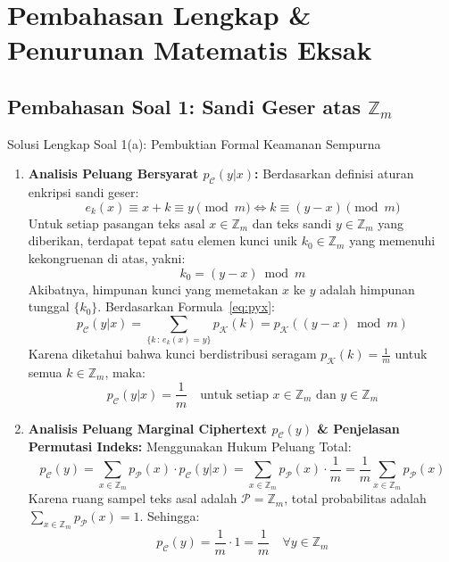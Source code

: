 \documentclass[11pt,a4paper]{article}
\begin{document}
\newpage

\section{Pembahasan Lengkap \& Penurunan Matematis Eksak}

\subsection{Pembahasan Soal 1: Sandi Geser atas $\mathbb{Z}_m$}

\begin{solusibox}{Solusi Lengkap Soal 1(a): Pembuktian Formal Keamanan Sempurna}
\begin{enumerate}[leftmargin=*]
    \item \textbf{Analisis Peluang Bersyarat $p_{\mathcal{C}}(y|x)$:}
    Berdasarkan definisi aturan enkripsi sandi geser:
    \[
    e_k(x) \equiv x + k \equiv y \pmod m \iff k \equiv (y - x) \pmod m
    \]
    Untuk setiap pasangan teks asal $x \in \mathbb{Z}_m$ dan teks sandi $y \in \mathbb{Z}_m$ yang diberikan, terdapat tepat satu elemen kunci unik $k_0 \in \mathbb{Z}_m$ yang memenuhi kekongruenan di atas, yakni:
    \[
    k_0 = (y - x) \bmod m
    \]
    Akibatnya, himpunan kunci yang memetakan $x$ ke $y$ adalah himpunan tunggal $\{k_0\}$. Berdasarkan Formula~\eqref{eq:pyx}:
    \[
    p_{\mathcal{C}}(y|x) = \sum_{\{k \,:\, e_k(x) = y\}} p_{\mathcal{K}}(k) = p_{\mathcal{K}}((y - x) \bmod m)
    \]
    Karena diketahui bahwa kunci berdistribusi seragam $p_{\mathcal{K}}(k) = \frac{1}{m}$ untuk semua $k \in \mathbb{Z}_m$, maka:
    \[
    p_{\mathcal{C}}(y|x) = \frac{1}{m} \quad \text{untuk setiap } x \in \mathbb{Z}_m \text{ dan } y \in \mathbb{Z}_m
    \]

    \item \textbf{Analisis Peluang Marginal Ciphertext $p_{\mathcal{C}}(y)$ \& Penjelasan Permutasi Indeks:}
    Menggunakan Hukum Peluang Total:
    \[
    p_{\mathcal{C}}(y) = \sum_{x \in \mathbb{Z}_m} p_{\mathcal{P}}(x) \cdot p_{\mathcal{C}}(y|x) = \sum_{x \in \mathbb{Z}_m} p_{\mathcal{P}}(x) \cdot \frac{1}{m} = \frac{1}{m} \sum_{x \in \mathbb{Z}_m} p_{\mathcal{P}}(x)
    \]
    Karena ruang sampel teks asal adalah $\mathcal{P} = \mathbb{Z}_m$, total probabilitas adalah $\sum_{x \in \mathbb{Z}_m} p_{\mathcal{P}}(x) = 1$. Sehingga:
    \[
    p_{\mathcal{C}}(y) = \frac{1}{m} \cdot 1 = \frac{1}{m} \quad \forall y \in \mathbb{Z}_m
    \]


\end{enumerate}
\end{solusibox}
\end{document}
